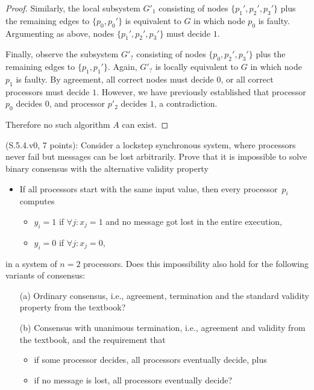 \begin{proof}
Similarly, the local subsystem $G'_1$ consisting of nodes $\{p_1', p_2', p_3'\}$
plus the remaining edges to $\{p_0, p_0'\}$ is equivalent to $G$ in which node
$p_0$ is faulty. Argumenting as above, nodes $\{p_1', p_2', p_3'\}$ must decide $1$.

Finally, observe the subsystem $G'_?$ consisting of nodes $\{p_0, p_2', p_3'\}$
plus the remaining edges to $\{p_1, p_1'\}$. Again, $G'_?$ is locally equivalent
to $G$ in which node $p_1$ is faulty. By agreement, all correct nodes must decide
$0$, or all correct processors must decide $1$.
However, we have previously established that processor $p_0$ decides $0$,
and processor $p'_2$ decides $1$, a contradiction.

Therefore no such algorithm $A$ can exist.
\end{proof}


\begin{Exc}{(S.5.4.v0, 7 points):}
Consider a lockstep synchronous system, where processors never fail but
messages can be lost arbitrarily. Prove that it is impossible to solve
binary consensus with the alternative validity property
\begin{itemize}
\item If all processors start with the same
input value, then every processor~$p_i$ computes
\begin{itemize}
\item $y_i=1$ if $\forall j: x_j=1$ and no message got
lost in the entire execution,
\item $y_i=0$ if $\forall j: x_j=0$,
\end{itemize}
\end{itemize}
in a system of $n=2$ processors. Does this impossibility also
hold for the following variants of consensus:
\begin{enumerate}
\item[(a)] Ordinary consensus, i.e., agreement, termination and
the standard validity property from the textbook?
\item[(b)] Consensus with unanimous termination, i.e., agreement and
validity from the textbook, and the requirement that
\begin{itemize}
\item if some processor decides, all processors eventually decide, plus
\item if no message is lost, all processors eventually decide?
\end{itemize}
\end{enumerate}
\end{Exc}

